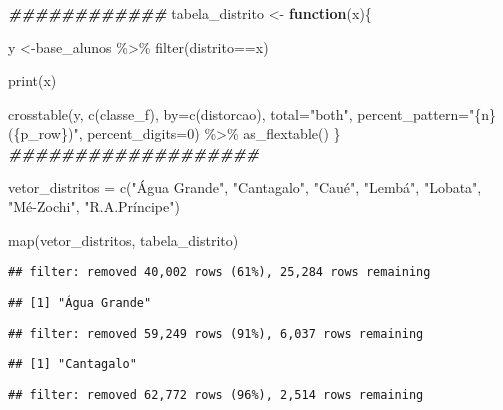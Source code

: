 \documentclass[
]{article}
\newenvironment{Shaded}{\begin{snugshade}}{\end{snugshade}}
\newcommand{\AttributeTok}[1]{\textcolor[rgb]{0.77,0.63,0.00}{#1}}
\newcommand{\ControlFlowTok}[1]{\textcolor[rgb]{0.13,0.29,0.53}{\textbf{#1}}}
\newcommand{\DecValTok}[1]{\textcolor[rgb]{0.00,0.00,0.81}{#1}}
\newcommand{\DocumentationTok}[1]{\textcolor[rgb]{0.56,0.35,0.01}{\textbf{\textit{#1}}}}
\newcommand{\FunctionTok}[1]{\textcolor[rgb]{0.00,0.00,0.00}{#1}}
\newcommand{\NormalTok}[1]{#1}
\newcommand{\OtherTok}[1]{\textcolor[rgb]{0.56,0.35,0.01}{#1}}
\newcommand{\SpecialCharTok}[1]{\textcolor[rgb]{0.00,0.00,0.00}{#1}}
\newcommand{\StringTok}[1]{\textcolor[rgb]{0.31,0.60,0.02}{#1}}
\begin{document}
\begin{Shaded}
\begin{Highlighting}[]
\DocumentationTok{\#\#\#\#\#\#\#\#\#\#\#\#}
\NormalTok{tabela\_distrito }\OtherTok{\textless{}{-}} \ControlFlowTok{function}\NormalTok{(x)\{}
  
\NormalTok{  y }\OtherTok{\textless{}{-}}\NormalTok{base\_alunos }\SpecialCharTok{\%\textgreater{}\%} 
    \FunctionTok{filter}\NormalTok{(distrito}\SpecialCharTok{==}\NormalTok{x)}

\FunctionTok{print}\NormalTok{(x)  }
  
\FunctionTok{crosstable}\NormalTok{(y, }\FunctionTok{c}\NormalTok{(classe\_f), }\AttributeTok{by=}\FunctionTok{c}\NormalTok{(distorcao), }\AttributeTok{total=}\StringTok{"both"}\NormalTok{, }\AttributeTok{percent\_pattern=}\StringTok{"\{n\} (\{p\_row\})"}\NormalTok{, }\AttributeTok{percent\_digits=}\DecValTok{0}\NormalTok{) }\SpecialCharTok{\%\textgreater{}\%} \FunctionTok{as\_flextable}\NormalTok{()}
\NormalTok{\}}
\DocumentationTok{\#\#\#\#\#\#\#\#\#\#\#\#\#\#\#\#\#\#\#}

\NormalTok{vetor\_distritos }\OtherTok{=} \FunctionTok{c}\NormalTok{(}\StringTok{"Água Grande"}\NormalTok{, }\StringTok{"Cantagalo"}\NormalTok{, }\StringTok{"Caué"}\NormalTok{, }\StringTok{"Lembá"}\NormalTok{,}
                    \StringTok{"Lobata"}\NormalTok{, }\StringTok{"Mé{-}Zochi"}\NormalTok{, }\StringTok{"R.A.Príncipe"}\NormalTok{)}

\FunctionTok{map}\NormalTok{(vetor\_distritos, tabela\_distrito)}
\end{Highlighting}
\end{Shaded}

\begin{verbatim}
## filter: removed 40,002 rows (61%), 25,284 rows remaining
\end{verbatim}

\begin{verbatim}
## [1] "Água Grande"
\end{verbatim}

\begin{verbatim}
## filter: removed 59,249 rows (91%), 6,037 rows remaining
\end{verbatim}

\begin{verbatim}
## [1] "Cantagalo"
\end{verbatim}

\begin{verbatim}
## filter: removed 62,772 rows (96%), 2,514 rows remaining
\end{verbatim}
\end{document}
